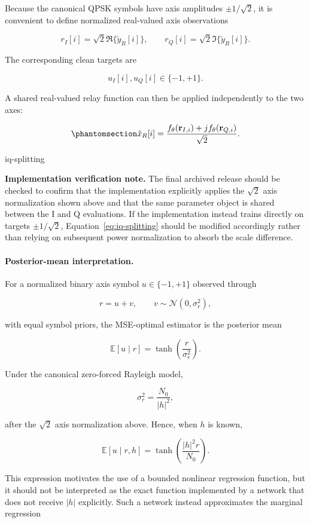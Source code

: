 Because the canonical QPSK symbols have axis amplitudes
$\pm1/\sqrt{2}$, it is convenient to define normalized real-valued
axis observations

\[
r_I[i]
=
\sqrt{2}\Re\{\tilde y_R[i]\},
\qquad
r_Q[i]
=
\sqrt{2}\Im\{\tilde y_R[i]\}.
\]

The corresponding clean targets are

\[
u_I[i],u_Q[i]\in\{-1,+1\}.
\]

A shared real-valued relay function can then be applied independently
to the two axes:

\begin{equation}\protect\phantomsection\label{eq:iq-splitting}
\hat x_R[i]
=
\frac{
f_\theta(\mathbf r_{I,i})
+
j f_\theta(\mathbf r_{Q,i})
}{\sqrt{2}}.
\end{equation}
{\protect\numberline{\theequation}\quad iq-splitting}

\textbf{Implementation verification note.}
The final archived release should be checked to confirm that the
implementation explicitly applies the $\sqrt{2}$ axis normalization
shown above and that the same parameter object is shared between the
I and Q evaluations. If the implementation instead trains directly on
targets $\pm1/\sqrt{2}$, Equation~\eqref{eq:iq-splitting} should be
modified accordingly rather than relying on subsequent power
normalization to absorb the scale difference.


\paragraph{Posterior-mean interpretation.}

For a normalized binary axis symbol $u\in\{-1,+1\}$ observed through

\[
r=u+v,
\qquad
v\sim\mathcal{N}(0,\sigma_r^2),
\]

with equal symbol priors, the MSE-optimal estimator is the posterior
mean

\[
\mathbb{E}[u\mid r]
=
\tanh\left(\frac{r}{\sigma_r^2}\right).
\]

Under the canonical zero-forced Rayleigh model,

\[
\sigma_r^2
=
\frac{N_0}{|h|^2},
\]

after the $\sqrt{2}$ axis normalization above. Hence, when $h$ is
known,

\[
\mathbb{E}[u\mid r,h]
=
\tanh\left(
\frac{|h|^2r}{N_0}
\right).
\]

This expression motivates the use of a bounded nonlinear regression
function, but it should not be interpreted as the exact function
implemented by a network that does not receive $|h|$ explicitly. Such
a network instead approximates the marginal regression

